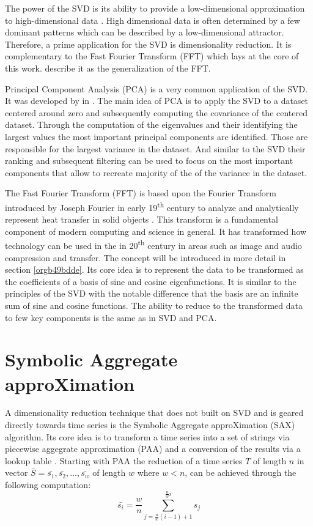 \documentclass[phd,black, hidelinks]{PrincetonThesis}
\begin{document}
The power of the SVD is its ability to provide a low-dimensional approximation to high-dimensional data \cite{brunton2019data}. High dimensional data is often determined by a few dominant patterns which can be described by a low-dimensional attractor. Therefore, a prime application for the SVD is dimensionality reduction. It is complementary to the Fast Fourier Transform (FFT) which lays at the core of this work. \citeauthor{brunton2019data} describe it as the generalization of the FFT.

Principal Component Analysis (PCA) is a very common application of the SVD. It was developed by \citeauthor{Pearson01} in \citeyear{Pearson01}. The main idea of PCA is to apply the SVD to a dataset centered around zero and subsequently computing the covariance of the centered dataset. Through the computation of the eigenvalues and their identifying the largest values the most important principal components are identified. Those are responsible for the largest variance in the dataset. And similar to the SVD their ranking and subsequent filtering can be used to focus on the most important components that allow to recreate majority of the of the variance in the dataset.

The Fast Fourier Transform (FFT) is based upon the Fourier Transform introduced by Joseph Fourier in early 19\textsuperscript{th} century to analyze and analytically represent heat transfer in solid objects \cite{fourier1822theorie}. This transform is a fundamental component of modern computing and science in general. It has transformed how technology can be used in the in 20\textsuperscript{th} century in areas such as image and audio compression and transfer. The concept will be introduced in more detail in section \ref{orgb49bdde}. Its core idea is to represent the data to be transformed as the coefficients of a basis of sine and cosine eigenfunctions. It is similar to the principles of the SVD with the notable difference that the basis are an infinite sum of sine and cosine functions. The ability to reduce to the transformed data to few key components is the same as in SVD and PCA.

\section{Symbolic Aggregate approXimation}
\label{sec:orga085728}
A dimensionality reduction technique that does not built on SVD and is geared directly towards time series is the Symbolic Aggregate approXimation (SAX) algorithm. Its core idea is to transform a time series into a set of strings via piecewise aggegrate approximation (PAA) and a conversion of the results via a lookup table \cite{Lin_2003}. Starting with PAA the reduction of a time series \(T\) of length \(n\) in vector \(\bar{S} = \bar{s_1}, \bar{s_2}, \dots, \bar{s_w}\) of length \(w\) where \(w < n\), can be achieved through the following computation:
\begin{equation}
\bar{s_i} = \frac{w}{n} \sum_{j=\frac{n}{w}(i-1)+1}^{\frac{n}{w}i} s_j
\end{equation}
\end{document}
